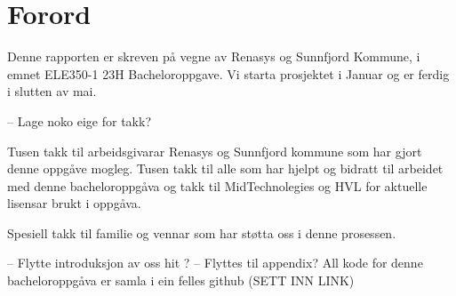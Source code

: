 \chapter{Forord}
\thispagestyle{romanpages}


Denne rapporten er skreven på vegne av \gls{Renasys}\citep{Renasys} og \gls{Sunnfjord Kommune}\citep{SunnfjordKommune}, i emnet
ELE350-1 23H Bacheloroppgave. Vi starta prosjektet i Januar og er ferdig i slutten av mai.

-- Lage noko eige for takk?

Tusen takk til arbeidsgivarar Renasys og Sunnfjord kommune som har gjort denne oppgåve mogleg.
Tusen takk til alle som har hjelpt og bidratt til arbeidet med denne bacheloroppgåva og
takk til MidTechnolegies og HVL for aktuelle lisensar brukt i oppgåva.

Spesiell takk til familie og vennar som har støtta oss i denne prosessen.



-- Flytte introduksjon av oss hit ? \newline
-- Flyttes til appendix? All kode for denne bacheloroppgåva er samla i ein felles github (SETT INN LINK)
